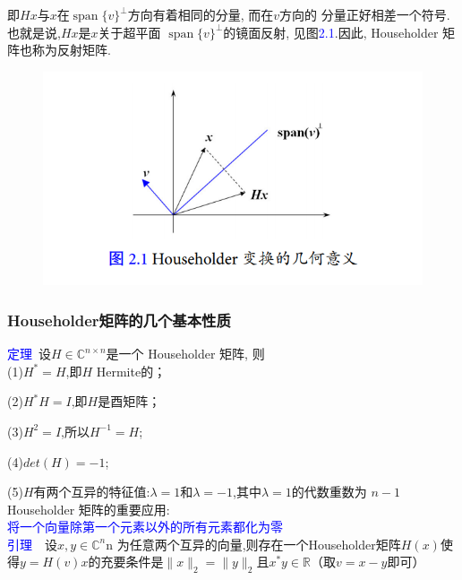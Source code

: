 \documentclass[notheorems,serif]{beamer}
\begin{document}
\begin{frame}
即$Hx$与$x$在$\operatorname{span}\{v\}^{\perp}$方向有着相同的分量, 而在$v$方向的
分量正好相差一个符号. 也就是说,$Hx$是$x$关于超平面
$\operatorname{span}\{v\}^{\perp}$的镜面反射, 见图\textcolor{blue}{2.1}.因此, Householder 矩阵也称为反射矩阵.

\begin{figure}
	\centering
	\includegraphics[scale=0.5]{figures/3-1.png}
\end{figure}
\end{frame}

\begin{frame}
\frametitle{Householder矩阵的几个基本性质}
\noindent \textcolor{blue}{定理}~设$H \in \mathbb{C}^{n \times n}$是一个 Householder 矩阵, 则\\
(1)$H^*=H$,即$H$ Hermite的；

(2)$H^*H=I$,即$H$是酉矩阵；

(3)$H^2=I$,所以$H^{-1}=H$;

(4)$det(H)=-1$;

(5)$H$有两个互异的特征值:$\lambda=1$和$\lambda=-1$,其中$\lambda=1$的代数重数为
$n-1$\\


\noindent Householder 矩阵的重要应用:\\
\textcolor{blue}{将一个向量除第一个元素以外的所有元素都化为零}\\



\noindent \textcolor{blue}{引理}~~设$x,y \in \mathbb{C}^n$n 为任意两个互异的向量,则存在一个Householder矩阵$H(x)$使得$y=H(v)x$的充要条件是$\|x\|_{2}=\|y\|_{2}\text{且} x^{*} y \in \mathbb{R}$（取$v=x-y$即可）
\end{frame}
\end{document}
